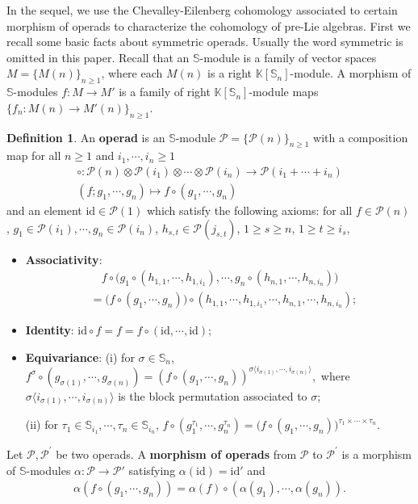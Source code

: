 \documentclass[12pt]{amsart}
\theoremstyle{definition}
\newtheorem{defi}[thm]{Definition}
\newcommand{\id}{\mathrm{id}}
\newcommand{\s}{\mathbb{S}}
\begin{document}
In the sequel, we use the Chevalley-Eilenberg cohomology associated to certain morphism of operads to characterize the cohomology of pre-Lie algebras. First we recall some basic facts about symmetric operads.  Usually the word symmetric is omitted in this paper.
Recall that an $\s$-module is a family of vector spaces $M=\{M(n)\}_{n\geq 1}$, where each $M(n)$ is a right $\mathds{K}[\s_n]$-module. A morphism of $\s$-modules $f : M\to M'$ is a family of right $\mathds{K}[\s_n]$-module maps $\{f_n:M(n)\to M'(n)\}_{n\geq 1}$.
\begin{defi}
An \textbf{operad} is an $\s$-module $\mathcal{P} = \{\mathcal{P}(n)\}_{n \geq 1}$ with a composition map for all $n\geq 1$ and $i_1,\cdots,i_n\geq 1$
\begin{align*}
\circ : \mathcal{P}(n) \otimes \mathcal{P}(i_1) \otimes \cdots \otimes \mathcal{P}(i_n) \to \mathcal{P}(i_1 + \cdots + i_n)\\
(f;g_1,\cdots,g_n)\mapsto f\circ(g_1,\cdots,g_n)
\end{align*}
and an element $\id \in \mathcal{P}(1)$ which satisfy the following axioms:
for all $f\in\mathcal{P}(n)$, $g_1\in \mathcal{P}(i_1),\cdots,g_n\in \mathcal{P}(i_n)$, $h_{s,t}\in \mathcal{P}(j_{s,t})$, $1\geq s\geq n$, $1\geq t\geq i_s$,
\begin{itemize}
\item {\bf Associativity}:
\begin{align*}
&\quad f\circ\bigl(g_1\circ(h_{1,1},\cdots,h_{1,i_1}),\cdots, g_n\circ(h_{n,1},\cdots,h_{n,i_n})\bigr)\\
&=\bigl(f\circ(g_1,\cdots,g_n)\bigr)\circ(h_{1,1},\cdots,h_{1,i_1},\cdots,h_{n,1},\cdots,h_{n,i_n});
\end{align*}
\item {\bf Identity}:
$
\id\circ f=f=f\circ(\id,\cdots,\id);
$
\item {\bf Equivariance}:
(i)  for $\sigma\in\s_n$,
$
	f^\sigma\circ (g_{\sigma(1)},\cdots,g_{\sigma(n)})=(f\circ(g_1,\cdots,g_n))^{\sigma\langle i_{\sigma(1)},\cdots,i_{\sigma(n)}\rangle},
$
where $\sigma\langle i_{\sigma(1)},\cdots,i_{\sigma(n)}\rangle$ is the block permutation associated to $\sigma$;

(ii) for $\tau_1\in \s_{i_1},\cdots, \tau_n\in \s_{i_n}$,
$
	f\circ(g_1^{\tau_1},\cdots,g_n^{\tau_n})=\bigl(f\circ(g_1,\cdots,g_n)\bigr)^{\tau_1\times\cdots\times\tau_n}.
$
\end{itemize}
\end{defi}

Let $\mathcal{P},\mathcal{P}^{\prime}$ be two operads. A \textbf{morphism of operads} from $\mathcal{P}$ to $\mathcal{P}^{\prime}$ is a morphism of $\s$-modules $\alpha:\mathcal{P}\to \mathcal{P}'$ satisfying $\alpha(\id)=\id'$ and
\begin{align*}
\alpha(f\circ(g_1,\cdots,g_n))=\alpha(f)\circ(\alpha(g_1),\cdots,\alpha(g_n)).
\end{align*}
\end{document}
